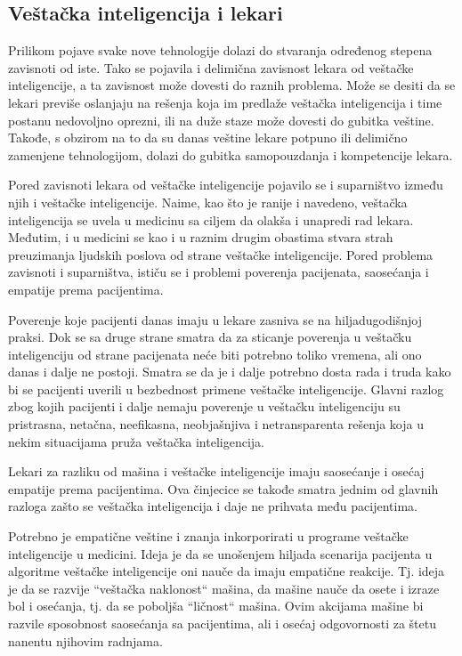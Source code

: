 \documentclass[a4paper]{article}
\begin{document}
\subsection{Veštačka inteligencija i lekari}
\label{subsec:veštačka_inteligencija_i_lekari}

Prilikom pojave svake nove tehnologije dolazi do stvaranja određenog stepena zavisnoti od iste. Tako se pojavila i delimična zavisnost lekara od veštačke inteligencije, a ta zavisnost može dovesti do raznih problema. Može se desiti da se lekari previše oslanjaju na rešenja koja im predlaže veštačka inteligencija i time postanu nedovoljno oprezni, ili na duže staze može dovesti do gubitka veštine. Takođe, s obzirom na to da su danas veštine lekare potpuno ili delimično zamenjene tehnologijom, dolazi do gubitka samopouzdanja i kompetencije lekara.

Pored zavisnoti lekara od veštačke inteligencije pojavilo se i suparništvo između njih i veštačke inteligencije. Naime, kao što je ranije i navedeno, veštačka inteligencija se uvela u medicinu sa ciljem da olakša i unapredi rad lekara. Međutim, i u medicini se kao i u raznim drugim obastima stvara strah preuzimanja ljudskih poslova od strane veštačke inteligencije. Pored problema zavisnoti i suparništva, ističu se i problemi poverenja pacijenata, saosećanja i empatije prema pacijentima.

Poverenje koje pacijenti danas imaju u lekare zasniva se na hiljadugodišnjoj praksi. Dok se sa druge strane smatra da za sticanje poverenja u veštačku inteligenciju od strane pacijenata neće biti potrebno toliko vremena, ali ono danas i dalje ne postoji. Smatra se da je i dalje potrebno dosta rada i truda kako bi se pacijenti uverili u bezbednost primene veštačke inteligencije. Glavni razlog zbog kojih pacijenti i dalje nemaju poverenje u veštačku inteligenciju su pristrasna, netačna, neefikasna, neobjašnjiva i netransparenta rešenja koja u nekim situacijama pruža veštačka inteligencija.

Lekari za razliku od mašina i veštačke inteligencije imaju saosećanje i osećaj empatije prema pacijentima. Ova činjecice se takođe smatra jednim od glavnih razloga zašto se veštačka inteligencija i daje ne prihvata među pacijentima.

Potrebno je empatične veštine i znanja inkorporirati u programe veštačke inteligencije u medicini. Ideja je da se unošenjem hiljada scenarija pacijenta u algoritme veštačke inteligencije oni nauče da imaju empatične reakcije. Tj. ideja je da se razvije “veštačka naklonost“ mašina, da mašine nauče da osete i izraze bol i osećanja, tj. da se poboljša “ličnost“ mašina. Ovim akcijama mašine bi razvile sposobnost saosećanja sa pacijentima, ali i osećaj odgovornosti za štetu nanentu njihovim radnjama.
\end{document}
